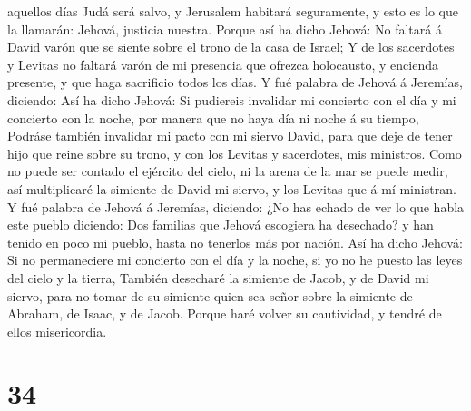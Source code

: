 aquellos días Judá será salvo, y Jerusalem habitará seguramente, y esto
es lo que la llamarán: Jehová, justicia nuestra.  Porque
así ha dicho Jehová: No faltará á David varón que se siente sobre el
trono de la casa de Israel;  Y de los sacerdotes y Levitas
no faltará varón de mi presencia que ofrezca holocausto, y encienda
presente, y que haga sacrificio todos los días.  Y fué
palabra de Jehová á Jeremías, diciendo:  Así ha dicho
Jehová: Si pudiereis invalidar mi concierto con el día y mi concierto
con la noche, por manera que no haya día ni noche á su tiempo,
 Podráse también invalidar mi pacto con mi siervo David,
para que deje de tener hijo que reine sobre su trono, y con los Levitas
y sacerdotes, mis ministros.  Como no puede ser contado el
ejército del cielo, ni la arena de la mar se puede medir, así
multiplicaré la simiente de David mi siervo, y los Levitas que á mí
ministran.  Y fué palabra de Jehová á Jeremías, diciendo:
 ¿No has echado de ver lo que habla este pueblo diciendo:
Dos familias que Jehová escogiera ha desechado? y han tenido en poco mi
pueblo, hasta no tenerlos más por nación.  Así ha dicho
Jehová: Si no permaneciere mi concierto con el día y la noche, si yo no
he puesto las leyes del cielo y la tierra,  También
desecharé la simiente de Jacob, y de David mi siervo, para no tomar de
su simiente quien sea señor sobre la simiente de Abraham, de Isaac, y de
Jacob. Porque haré volver su cautividad, y tendré de ellos misericordia.

\hypertarget{section-33}{%
\section{34}\label{section-33}}

